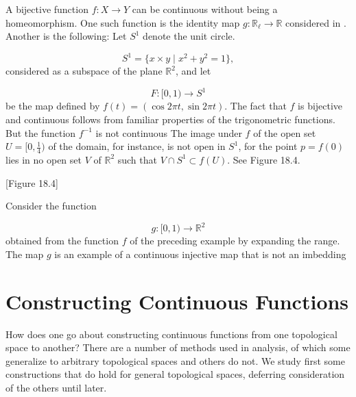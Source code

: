 \begin{centeredblock*}
\begin{example}
\label{ex:\thesection.\theexample}
 A bijective function \(f : X \rightarrow Y\) can be continuous without being a homeomorphism. One such function is the identity map \(g : \mathbb{R}_{\ell } \rightarrow \mathbb{R}\) considered in . Another is the following: Let \( S^{1}\) denote the unit circle.

 \[
 S^{1} = \{ {x \times y \mid {x}^{2} + y^{2} = 1}\},
 \]
 considered as a subspace of the plane \(\mathbb{R}^{2}\), and let

 \[
 F : \lbrack 0,1) \rightarrow {S}^{1}
 \]
 be the map defined by \(f( t) = ( {\cos {2\pi t},\sin {2\pi t}})\). The fact that \(f\) is bijective and continuous follows from familiar properties of the trigonometric functions. But the function \(f^{-1}\) is not continuous The image under \(f\) of the open set \(U = [ {0,\frac{1}{4}})\) of the domain, for instance, is not open in \(S^{1}\), for the point \(p = f( 0)\) lies in no open set \(V\) of \(\mathbb{R}^{2}\) such that \(V \cap {S}^{1} \subset f( U)\). See Figure 18.4.

 [Figure 18.4]
\end{example}
\end{centeredblock*}

\begin{centeredblock}
\begin{example}
\label{ex:\thesection.\theexample}
 Consider the function

 \[
 g : \lbrack 0,1) \rightarrow {\mathbb{R}}^{2}
 \]
 obtained from the function \(f\) of the preceding example by expanding the range. The map \(g\) is an example of a continuous injective map that is not an imbedding
\end{example}
\end{centeredblock}

\section*{Constructing Continuous Functions}

How does one go about constructing continuous functions from one topological space to another? There are a number of methods used in analysis, of which some generalize to arbitrary topological spaces and others do not. We study first some constructions that do hold for general topological spaces, deferring consideration of the others until later.

